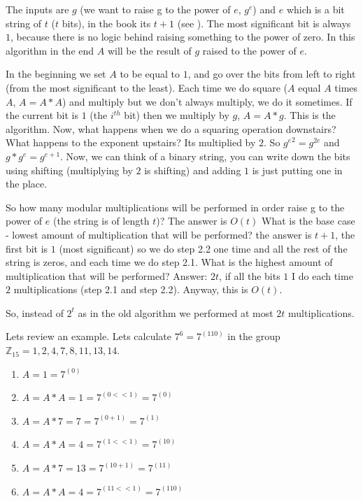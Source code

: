 The inputs are $g$ (we want to raise g to the power of $e$, \(g^e\)) and \(e\) which is a bit string of $t$ ($t$ bits), in the book its $t+1$ (see ). The most significant bit is always $1$, because there is no logic behind raising something to the power of zero. In this algorithm in the end \(A\) will be the result of $g$ raised to the power of $e$. 

In the beginning we set $A$ to be equal to $1$, and go over the bits from left to right (from the most significant to the least). Each time we do square ($A$ equal $A$ times $A$, $A=A*A$) and multiply but we don't always multiply, we do it sometimes. If the current bit is $1$ (the \( i^{th}\) bit) then we multiply by $g$, $A=A*g$. This is the algorithm. Now, what happens when we do a squaring operation downstairs? What happens to the exponent upstairs? Its multiplied by $2$. So \({g^{e}}^2 = g^{2e} \)  and  \(g*g^{e} = g^{e+1} \). Now, we can think of a binary string, you can write down the bits using shifting (multiplying by $2$ is shifting) and adding $1$ is just putting one in the place.

So how many modular multiplications will be performed in order raise g to the power of $e$ (the string is of length $t$)? The answer is \(O(t)\) What is the base case - lowest amount of multiplication that will be performed? the answer is $t+1$, the first bit is $1$ (most significant) so we do step 2.2 one time and all the rest of the string is zeros, and each time we do step 2.1. What is the  highest amount of multiplication that will be performed? Answer: $2t$, if all the bits $1$ I do each time $2$ multiplications (step 2.1 and step 2.2). Anyway, this is \(O(t)\).

So, instead of \(2^t\) as in the old algorithm we performed at most $2t$ multiplications. 

Lets review an example. Lets calculate \(7^6=7^{(110)}\) in the group \( \mathbb{Z}_{15}={1, 2, 4 ,7, 8, 11, 13, 14} \).

\begin{enumerate}
	\item  \(A = 1 = 7^(0) \)
	\item  \(A = A*A = 1 = 7^{(0<<1)} = 7^{(0)}\)
	\item  \(A = A*7 = 7 = 7^{(0+1)} = 7^{(1)}\)
	\item  \(A = A*A = 4 = 7^{(1<<1)} = 7^{(10)} \)
	\item  \(A = A*7 = 13 = 7^{(10+1)} = 7^{(11)} \)
	\item  \( A = A*A = 4 = 7^{(11<<1)} = 7^{(110)} \)
\end{enumerate}

